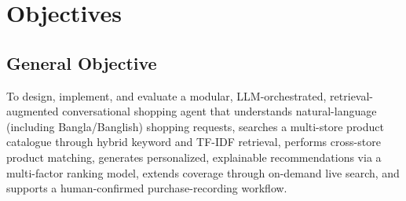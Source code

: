 \documentclass[12pt,a4paper]{report}
\begin{document}
\section{Objectives}
\subsection{General Objective}
To design, implement, and evaluate a modular, LLM-orchestrated, retrieval-augmented conversational
shopping agent that understands natural-language (including Bangla/Banglish) shopping requests, searches a
multi-store product catalogue through hybrid keyword and TF-IDF retrieval, performs cross-store product
matching, generates personalized, explainable recommendations via a multi-factor ranking model, extends
coverage through on-demand live search, and supports a human-confirmed purchase-recording workflow.
\end{document}
